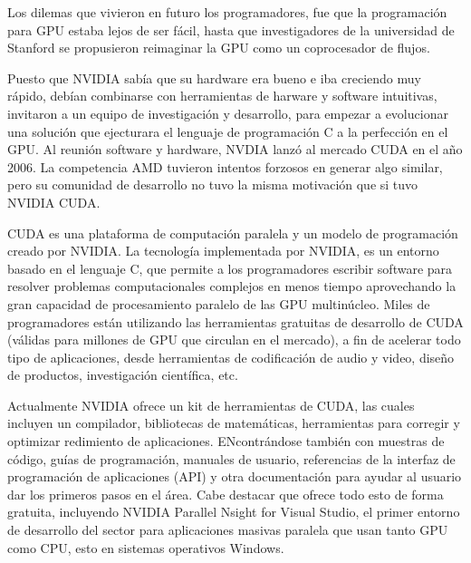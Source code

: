 Los dilemas que vivieron en futuro los programadores, fue que la programación para GPU estaba lejos de ser fácil, hasta que investigadores de la universidad de 
Stanford se propusieron reimaginar la GPU como un coprocesador de flujos.

Puesto que NVIDIA sabía que su hardware era bueno e iba creciendo muy rápido, debían combinarse con herramientas de harware y software intuitivas, invitaron
a un equipo de investigación y desarrollo, para empezar a evolucionar una solución que ejecturara el lenguaje de programación C a la perfección en el GPU.
Al reunión software y hardware, NVDIA lanzó al mercado CUDA en el año 2006. La competencia AMD tuvieron intentos forzosos en generar algo similar, pero su comunidad
de desarrollo no tuvo la misma motivación que si tuvo NVIDIA CUDA.

CUDA es una plataforma de computación paralela y un modelo de programación creado por NVIDIA.
La tecnología implementada por NVIDIA, es un entorno basado en el lenguaje C, que permite a los programadores escribir software para resolver problemas
computacionales complejos en menos tiempo aprovechando la gran capacidad de procesamiento paralelo de las GPU multinúcleo. Miles de programadores están utilizando
las herramientas gratuitas de desarrollo de CUDA (válidas para millones de GPU que circulan en el mercado), a fin de acelerar todo tipo de aplicaciones, desde
herramientas de codificación de audio y video, diseño de productos, investigación científica, etc.

Actualmente NVIDIA ofrece un kit de herramientas de CUDA, las cuales incluyen un compilador, bibliotecas de matemáticas, herramientas para corregir y optimizar
redimiento de aplicaciones. ENcontrándose también con muestras de código, guías de programación, manuales de usuario, referencias de la interfaz de programación
de aplicaciones (API) y otra documentación para ayudar al usuario dar los primeros pasos en el área. Cabe destacar que ofrece todo esto de forma gratuita,
incluyendo NVIDIA Parallel Nsight for Visual Studio, el primer entorno de desarrollo del sector para aplicaciones masivas paralela que usan tanto GPU como CPU, esto
en sistemas operativos Windows.
